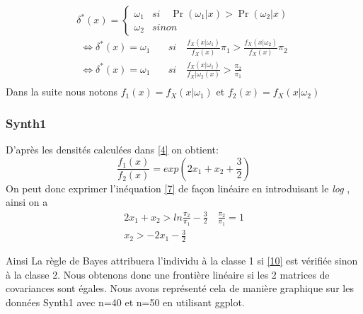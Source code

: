 \documentclass[10pt]{article}
\begin{document}
\[\delta^{*}(x) = \begin{cases} \omega_{1} & si  \quad \Pr(\omega_{1}|x)>  \Pr(\omega_{2}|x) \\
	\omega_{2} & sinon \end{cases}\]
\begin{equation}
\begin{split}
 \iff \delta^{*}(x) = \omega_{1} \quad & si \quad  \frac{f_{X}(x|\omega_{1})}{f_{X}(x)} \pi_{1}> \frac{f_{X}(x|\omega_{2})}{f_{X}(x)}\pi_{2} \\ 
\iff \delta^{*}(x) = \omega_{1} \quad & si \quad  \frac{f_{X}(x|\omega_{1})}{f_{X}|\omega_{2}(x)} > \frac{\pi_{2}}{\pi_{1}} \\ 
\end{split}
\label{9}
\end{equation}
 Dans la suite nous notons $f_1(x) = f_{X}(x|\omega_{1})$ et $f_2(x) = f_{X}(x|\omega_{2})$

\subsubsection{Synth1}
D'après les densités calculées dans \eqref{4} on obtient: \[\frac{f_{1}(x)}{f_{2}(x)} = exp(2x_{1} + x_{2} + \frac{3}{2})\]
On peut donc exprimer l'inéquation \ref{7} de façon linéaire en introduisant le \textit{log} , ainsi on a
\begin{equation}
\begin{split}
2x_{1} + x_{2} > ln\frac{\pi_{2}}{\pi_{1}} - \frac{3}{2}   \quad \frac{\pi_{2}}{\pi_{1}} = 1 \\
x_{2} >  -2x_{1} - \frac{3}{2}
\label{10}
\end{split}
\end{equation}

Ainsi La règle de Bayes attribuera l'individu à la classe 1 si \eqref{10} est vérifiée sinon à la classe 2. Nous obtenons donc une frontière linéaire si les 2 matrices de covariances sont égales. Nous avons représenté cela de manière graphique sur les données Synth1 avec n=40 et n=50 en utilisant ggplot.\\
\end{document}
